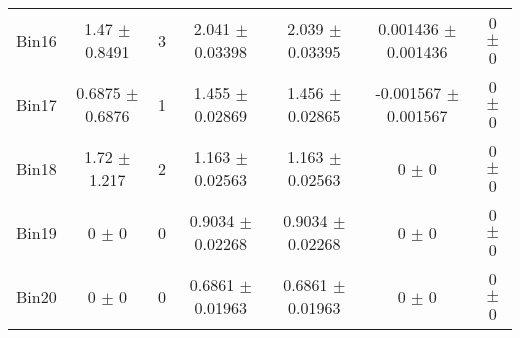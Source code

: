 \begin{tabular}{@{\extracolsep{4pt}}lcccccc@{}}
     Bin16 & 1.47 $\pm$ 0.8491 & 3 & 2.041 $\pm$ 0.03398 & 2.039 $\pm$ 0.03395 & 0.001436 $\pm$ 0.001436 & 0 $\pm$ 0 \\ 
     Bin17 & 0.6875 $\pm$ 0.6876 & 1 & 1.455 $\pm$ 0.02869 & 1.456 $\pm$ 0.02865 & -0.001567 $\pm$ 0.001567 & 0 $\pm$ 0 \\ 
     Bin18 & 1.72 $\pm$ 1.217 & 2 & 1.163 $\pm$ 0.02563 & 1.163 $\pm$ 0.02563 & 0 $\pm$ 0 & 0 $\pm$ 0 \\ 
     Bin19 & 0 $\pm$ 0 & 0 & 0.9034 $\pm$ 0.02268 & 0.9034 $\pm$ 0.02268 & 0 $\pm$ 0 & 0 $\pm$ 0 \\ 
     Bin20 & 0 $\pm$ 0 & 0 & 0.6861 $\pm$ 0.01963 & 0.6861 $\pm$ 0.01963 & 0 $\pm$ 0 & 0 $\pm$ 0 \\ 
\hline\hline
  \end{tabular}
